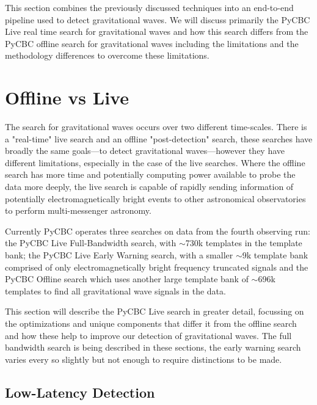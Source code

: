 %


This section combines the previously discussed techniques into an end-to-end pipeline used to detect gravitational waves. We will discuss primarily the PyCBC Live real time search for gravitational waves and how this search differs from the PyCBC offline search for gravitational waves including the limitations and the methodology differences to overcome these limitations.

\section{\label{2:sec:offline-vs-live}Offline vs Live}

The search for gravitational waves occurs over two different time-scales. There is a "real-time" live search and an offline "post-detection" search, these searches have broadly the same goals---to detect gravitational waves---however they have different limitations, especially in the case of the live searches. Where the offline search has more time and potentially computing power available to probe the data more deeply, the live search is capable of rapidly sending information of potentially electromagnetically bright events to other astronomical observatories to perform multi-messenger astronomy.

Currently PyCBC operates three searches on data from the fourth observing run: the PyCBC Live Full-Bandwidth search, with $\sim$730k templates in the template bank; the PyCBC Live Early Warning search, with a smaller $\sim$9k template bank comprised of only electromagnetically bright frequency truncated signals and the PyCBC Offline search which uses another large template bank of $\sim$696k templates to find all gravitational wave signals in the data.

This section will describe the PyCBC Live search in greater detail, focussing on the optimizations and unique components that differ it from the offline search and how these help to improve our detection of gravitational waves. The full bandwidth search is being described in these sections, the early warning search varies every so slightly but not enough to require distinctions to be made.

\subsection{\label{2:sec:low-latency-detection}Low-Latency Detection}

